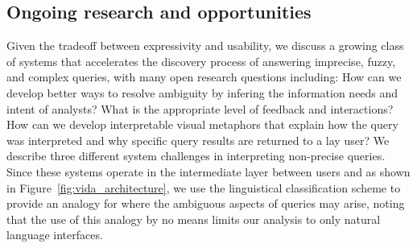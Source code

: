 \subsection{Ongoing research and opportunities}
\par Given the tradeoff between expressivity and usability, we discuss a growing class of systems that accelerates the discovery process of answering imprecise, fuzzy, and complex queries, with many open research questions including: How can we develop better ways to resolve ambiguity by infering the information needs and intent of analysts? What is the appropriate level of feedback and interactions? How can we develop interpretable visual metaphors that explain how the query was interpreted and why specific query results are returned to a lay user? We describe three different system challenges in interpreting non-precise queries. Since these systems operate in the intermediate layer between users and \vidaql as shown in Figure~\ref{fig:vida_architecture}, we use the linguistical classification scheme to provide an analogy for where the ambiguous aspects of queries may arise, noting that the use of this analogy by no means limits our analysis to only natural language interfaces.

